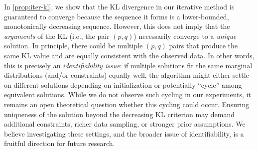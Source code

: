 In \cref{prop:iter-kl}, we show that the KL divergence in our iterative method is guaranteed to converge because the sequence it forms is a lower-bounded, monotonically decreasing sequence. However, this does not imply that the \emph{arguments} of the KL (i.e., the pair \((p,q)\)) necessarily converge to a \emph{unique} solution. In principle, there could be multiple \((p,q)\) pairs that produce the same KL value and are equally consistent with the observed data. In other words, this is precisely an \emph{identifiability issue}: if multiple solutions fit the same marginal distributions (and/or constraints) equally well, the algorithm might either settle on different solutions depending on initialization or potentially ``cycle'' among equivalent solutions. While we
do not observe such cycling in our experiments, it remains an open theoretical question whether this cycling could occur. Ensuring uniqueness of the solution beyond the decreasing KL criterion may demand additional constraints, richer data sampling, or stronger prior assumptions. We believe investigating these settings, and the broader issue of identifiability, is a fruitful direction for future research.

